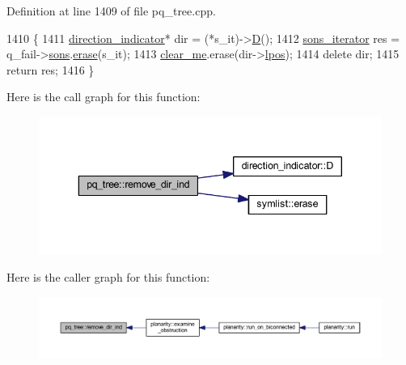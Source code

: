 Definition at line 1409 of file pq\+\_\+tree.\+cpp.


\begin{DoxyCode}
1410 \{
1411     \mbox{\hyperlink{classdirection__indicator}{direction\_indicator}}* dir = (*s\_it)->\mbox{\hyperlink{classdirection__indicator_aef2ff42f0a64c7d10fbf42059c008f38}{D}}();
1412     \mbox{\hyperlink{classpq__tree_ab47263066d4b0acc70e00043870d748a}{sons\_iterator}} res = q\_fail->\mbox{\hyperlink{classpq__node_a2cc030cfa4560872acea8b50ebd0542b}{sons}}.\mbox{\hyperlink{classsymlist_a75fc1fc7db7b20cc430ddb8577608904}{erase}}(s\_it);
1413     \mbox{\hyperlink{classpq__tree_a43bcdb58d91b7e20860f523f49c74fd1}{clear\_me}}.erase(dir->\mbox{\hyperlink{classpq__node_a71cc9bb3c11aac468ff77d64643c38dc}{lpos}});
1414     \textcolor{keyword}{delete} dir;
1415     \textcolor{keywordflow}{return} res;
1416 \}
\end{DoxyCode}
Here is the call graph for this function\+:\nopagebreak
\begin{figure}[H]
\begin{center}
\leavevmode
\includegraphics[width=343pt]{classpq__tree_a68737f5cebd17670d9b73b797ca01a74_cgraph}
\end{center}
\end{figure}
Here is the caller graph for this function\+:\nopagebreak
\begin{figure}[H]
\begin{center}
\leavevmode
\includegraphics[width=350pt]{classpq__tree_a68737f5cebd17670d9b73b797ca01a74_icgraph}
\end{center}
\end{figure}
\mbox{\label{classpq__tree_ae98dec503a8e312db7fd5f28360f3f0e}} 
